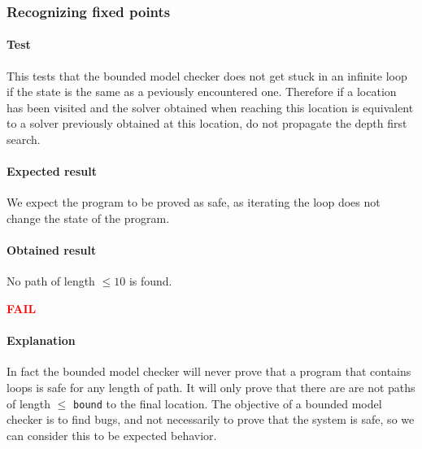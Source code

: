 \documentclass[letterpaper,12pt]{article}
\begin{document}
\subsubsection{Recognizing fixed points}
\paragraph{Test}
This tests that the bounded model checker does not get stuck in an infinite loop if the state is the same as a peviously encountered one. Therefore if a location has been visited and the solver obtained when reaching this location is equivalent to a solver previously obtained at this location, do not propagate the depth first search.

\paragraph{Expected result}
We expect the program to be proved as safe, as iterating the loop does not change the state of the program.
\paragraph{Obtained result}
No path of length $\leq 10$ is found.
 
\textbf{\textcolor{red}{FAIL}}

\paragraph{Explanation}
In fact the bounded model checker will never prove that a program that contains loops is safe for any length of path. It will only prove that there are are not paths of length $\leq$ \texttt{bound} to the final location. The objective of a bounded model checker is to find bugs, and not necessarily to prove that the system is safe, so we can consider this to be expected behavior.
\end{document}
